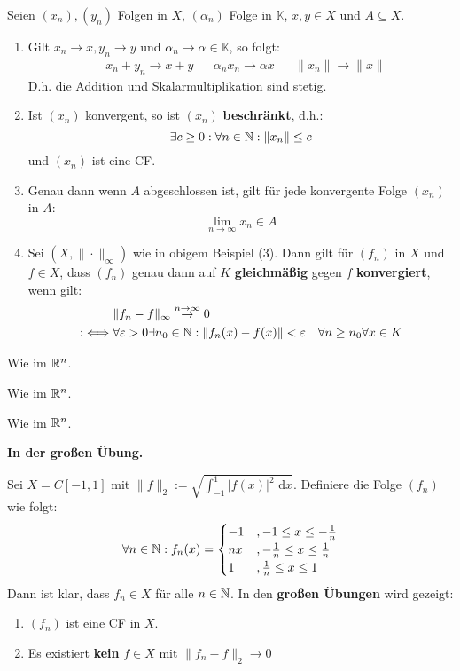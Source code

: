 \documentclass[a4paper,oneside,DIV15,BCOR12mm,chapterprefix=true,headings=onelinechapter]{scrbook}
\begin{document}
\begin{satz}
Seien $(x_n),(y_n)$ Folgen in $X$, $(\alpha_n)$ Folge in $\mathbb{K}$, $x,y\in X$ und
$A\subseteq X$.
\begin{enumerate}
\item Gilt $x_n\to x,y_n\to y$ und $\alpha_n\to\alpha\in\mathbb{K}$, so folgt:
\begin{align*}
&x_n+y_n\to x+y& &\alpha_n x_n\to\alpha x& &\|x_n\|\to\|x\|
\end{align*}
D.h. die Addition und Skalarmultiplikation sind stetig.
\item Ist $(x_n)$ konvergent, so ist $(x_n)$ \textbf{beschränkt}, d.h.:
\[\exists c\ge 0:\forall n\in\mathbb{N}:\|x_n\|\le c\]
und $(x_n)$ ist eine CF.
\item Genau dann wenn $A$ abgeschlossen ist, gilt für jede konvergente Folge $(x_n)$ in $A$:
\[\lim_{n\to\infty}x_n\in A\]
\item Sei $(X,\|\cdot\|_\infty)$ wie in obigem Beispiel (3). Dann gilt für
$(f_n)$ in $X$ und $f\in X$, dass $(f_n)$ genau dann auf $K$ \textbf{gleichmäßig} gegen $f$ 
\textbf{konvergiert}, wenn gilt:
\begin{align*}
&\|f_n-f\|_\infty \stackrel{n\to\infty}{\to}0\\
:\iff &\forall\varepsilon>0\exists n_0\in\mathbb{N}:\|f_n(x)-f(x)\|<\varepsilon\quad \forall n\ge n_0\forall x\in K
\end{align*}
\end{enumerate}
\end{satz}

\begin{beweise}
\item Wie im $\mathbb{R}^n$.
\item Wie im $\mathbb{R}^n$.
\item Wie im $\mathbb{R}^n$.
\item \textbf{\color{red}In der großen Übung.}
\end{beweise}

\begin{beispiel}
Sei $X=C[-1,1]$ mit $\|f\|_2:=\sqrt{\int_{-1}^1 |f(x)|^2\text{ d}x}$. Definiere die
Folge $(f_n)$ wie folgt:
\[\forall n\in\mathbb{N}: f_n(x)=
\begin{cases}
-1&,-1\le x\le -\frac1n\\
nx&,-\frac1n\le x\le \frac1n\\
1&,\frac1n\le x\le 1
\end{cases}\]
Dann ist klar, dass $f_n\in X$ für alle $n\in\mathbb{N}$. In den \textbf{\color{red}großen Übungen} wird gezeigt:
\begin{enumerate}
\item $(f_n)$ ist eine CF in $X$.
\item Es existiert \textbf{kein} $f\in X$ mit $\|f_n-f\|_2\to 0$
\end{enumerate}
\end{beispiel}
\end{document}
